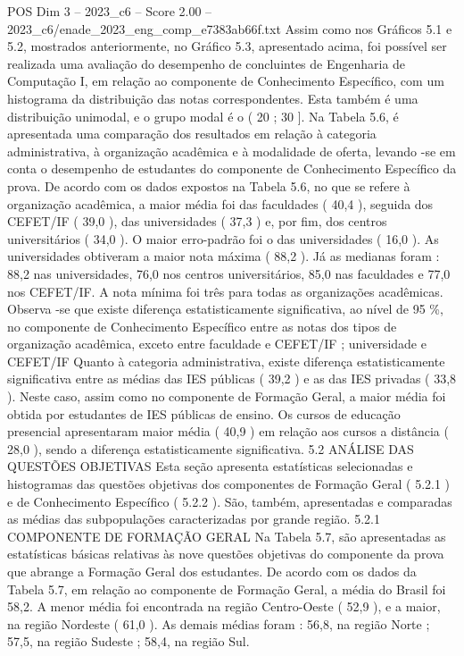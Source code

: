 \begin{textsample}{POS Dim 3 – 2023\_c6 – Score 2.00 – 2023\_c6/enade\_2023\_eng\_comp\_e7383ab66f.txt}
Assim como nos Gráficos 5.1 e 5.2, mostrados anteriormente, no Gráfico 5.3, apresentado acima, foi possível ser realizada uma avaliação do desempenho de concluintes de Engenharia de Computação I, em relação ao componente de Conhecimento Específico, com um histograma da distribuição das notas correspondentes.
Esta também é uma distribuição unimodal, e o grupo modal é o ( 20 ; 30 ].
Na Tabela 5.6, é apresentada uma comparação dos resultados em relação à categoria administrativa, à organização acadêmica e à modalidade de oferta, levando -se em conta o desempenho de estudantes do componente de Conhecimento Específico da prova.
De acordo com os dados expostos na Tabela 5.6, no que se refere à organização acadêmica, a maior média foi das faculdades ( 40,4 ), seguida dos CEFET/IF ( 39,0 ), das universidades ( 37,3 ) e, por fim, dos centros universitários ( 34,0 ).
O maior erro-padrão foi o das universidades ( 16,0 ).
As universidades obtiveram a maior nota máxima ( 88,2 ).
Já as medianas foram : 88,2 nas universidades, 76,0 nos centros universitários, 85,0 nas faculdades e 77,0 nos CEFET/IF.
A nota mínima foi três para todas as organizações acadêmicas.
Observa -se que existe diferença estatisticamente significativa, ao nível de 95 \%, no componente de Conhecimento Específico entre as notas dos tipos de organização acadêmica, exceto entre faculdade e CEFET/IF ; universidade e CEFET/IF Quanto à categoria administrativa, existe diferença estatisticamente significativa entre as médias das IES públicas ( 39,2 ) e as das IES privadas ( 33,8 ).
Neste caso, assim como no componente de Formação Geral, a maior média foi obtida por estudantes de IES públicas de ensino.
Os cursos de educação presencial apresentaram maior média ( 40,9 ) em relação aos cursos a distância ( 28,0 ), sendo a diferença estatisticamente significativa. 5.2 ANÁLISE DAS QUESTÕES OBJETIVAS Esta seção apresenta estatísticas selecionadas e histogramas das questões objetivas dos componentes de Formação Geral ( 5.2.1 ) e de Conhecimento Específico ( 5.2.2 ).
São, também, apresentadas e comparadas as médias das subpopulações caracterizadas por grande região. 5.2.1 COMPONENTE DE FORMAÇÃO GERAL Na Tabela 5.7, são apresentadas as estatísticas básicas relativas às nove questões objetivas do componente da prova que abrange a Formação Geral dos estudantes.
De acordo com os dados da Tabela 5.7, em relação ao componente de Formação Geral, a média do Brasil foi 58,2.
A menor média foi encontrada na região Centro-Oeste ( 52,9 ), e a maior, na região Nordeste ( 61,0 ).
As demais médias foram : 56,8, na região Norte ; 57,5, na região Sudeste ; 58,4, na região Sul.

\end{textsample}
